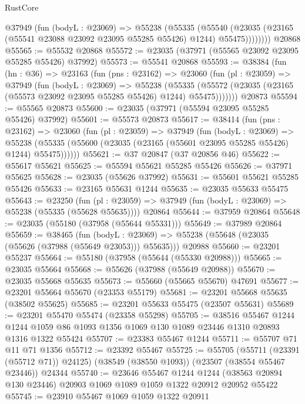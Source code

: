 \begin{lexlean}{RustCore}
\begin{coremodule}
          @37949
            (fun (bodyL : @23069) =>
            @55238
              (@55335
                (@55540
                  (@23035 (@23165 (@55541 @23088 @23092 @23095 @55285 @55426) @1244) @55475))))))))
    @20868
@55565 := @55532 @20868
@55572 := @23035 (@37971 (@55565 @23092 @23095 @55285 @55426) @37992)
@55573 := @55541 @20868
@55593 := @38384
    (fun (hn : @36) =>
    @23163
      (fun (pns : @23162) =>
      @23060
        (fun (pl : @23059) =>
        @37949
          (fun (bodyL : @23069) =>
          @55238
            (@55335
              (@55572 (@23035 (@23165 (@55573 @23092 @23095 @55285 @55426) @1244) @55475)))))))
    @20873
@55594 := @55565 @20873
@55600 := @23035 (@37971 (@55594 @23095 @55285 @55426) @37992)
@55601 := @55573 @20873
@55617 := @38414
    (fun (pns : @23162) =>
    @23060
      (fun (pl : @23059) =>
      @37949
        (fun (bodyL : @23069) =>
        @55238 (@55335 (@55600 (@23035 (@23165 (@55601 @23095 @55285 @55426) @1244) @55475))))))
@55621 := @37 @20847 (@37 @20856 @46)
@55622 := @55617 @55621
@55625 := @55594 @55621 @55285 @55426
@55626 := @37971 @55625
@55628 := @23035 (@55626 @37992)
@55631 := @55601 @55621 @55285 @55426
@55633 := @23165 @55631 @1244
@55635 := @23035 @55633 @55475
@55643 := @23250
    (fun (pl : @23059) => @37949 (fun (bodyL : @23069) => @55238 (@55335 (@55628 @55635))))
    @20864
@55644 := @37959 @20864
@55648 := @23035 (@55180 (@37958 (@55644 @55331)))
@55649 := @37989 @20864
@55659 := @38465
    (fun (bodyL : @23069) => @55238 (@55648 (@23035 (@55626 (@37988 (@55649 @23053))) @55635)))
    @20988
@55660 := @23201 @55237
@55664 := @55180 (@37958 (@55644 (@55330 @20988)))
@55665 := @23035 @55664
@55668 := @55626 (@37988 (@55649 @20988))
@55670 := @23035 @55668 @55635
@55673 := @55660 (@55665 @55670) @47691
@55677 := @23201 @55664 @55670 (@23353 @55179)
@55681 := @23201 @55668 @55635 (@38502 @55625)
@55685 := @23201 @55633 @55475 (@23507 @55631)
@55689 := @23201 @55470 @55474 (@23358 @55298)
@55705 := @38516
    @55467
    @1244
    @1244
    @1059
    @86
    @1093
    @1356
    @1069
    @130
    @1089
    @23446
    @1310
    @20893
    @1316
    @1322
    @55424
@55707 := @23383 @55467 @1244
@55711 := @55707 @71 @11 @71 @1356
@55712 := @23392 @55467
@55725 := @55705
    (@55711 (@23391 (@55712 @71)) @24125)
    (@38549 (@38550 @1093))
    (@23507 (@38554 @55467 @23446))
    @24344
@55740 := @23646
    @55467
    @1244
    @1244
    (@38563 @20894 @130 @23446)
    @20903
    @1069
    @1089
    @1059
    @1322
    @20912
    @20952
    @55422
@55745 := @23910 @55467 @1069 @1059 @1322 @20911

\end{coremodule}
\end{lexlean}
